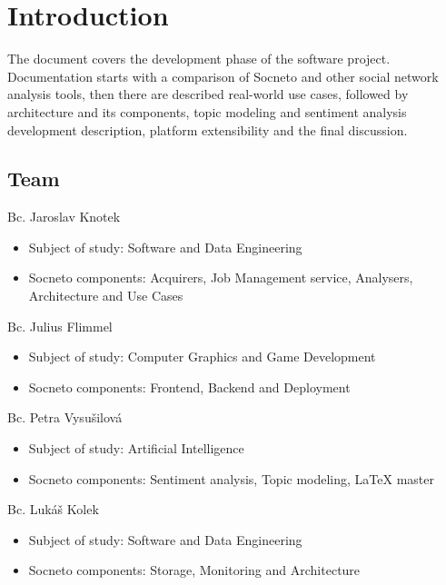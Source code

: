 
\chapter{Introduction}

The document covers the development phase of the software project. Documentation starts with a comparison of Socneto and other social network analysis tools, then there are described real-world use cases, followed by architecture and its components, topic modeling and sentiment analysis development description, platform extensibility and the final discussion.

\section{Team}

Bc. Jaroslav Knotek
\begin{itemize}
\renewcommand\labelitemi{--}
    \item Subject of study: Software and Data Engineering
    \item Socneto components: Acquirers, Job Management service, Analysers, Architecture and Use Cases
\end{itemize}
Bc. Julius Flimmel
\begin{itemize}
\renewcommand\labelitemi{--}
    \item Subject of study: Computer Graphics and Game Development
    \item Socneto components: Frontend, Backend and Deployment
\end{itemize}
Bc. Petra Vysušilová
\begin{itemize}
\renewcommand\labelitemi{--}
    \item Subject of study: Artificial Intelligence
    \item Socneto components: Sentiment analysis, Topic modeling, LaTeX master
\end{itemize}
Bc. Lukáš Kolek
\begin{itemize}
\renewcommand\labelitemi{--}
    \item Subject of study: Software and Data Engineering
    \item Socneto components: Storage, Monitoring and Architecture
\end{itemize}

